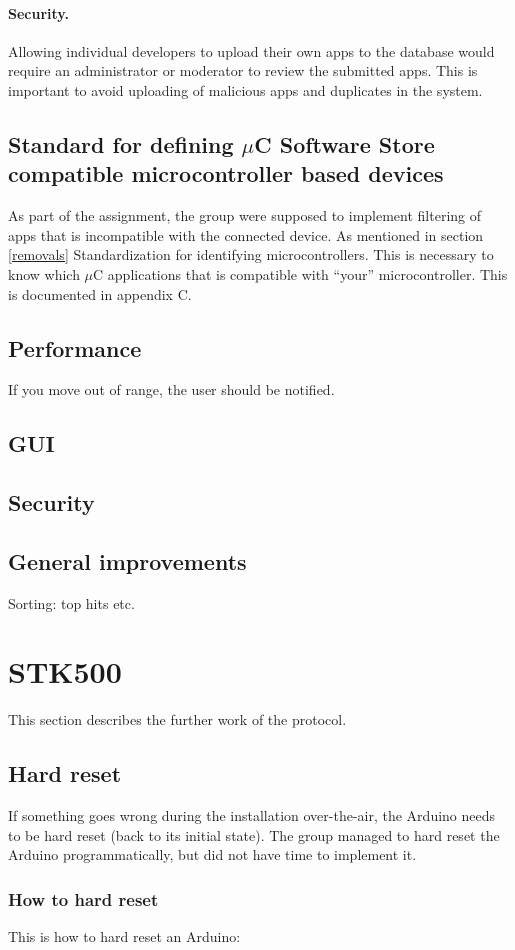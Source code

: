 	\paragraph{Security.} Allowing individual developers to upload their own apps to the database would require an administrator or moderator to review the submitted apps. This is important to avoid uploading of malicious apps and duplicates in the system.

	\subsection{Standard for defining $\mu$C Software Store compatible microcontroller based devices}
	As part of the assignment, the group were supposed to implement filtering of apps that is incompatible with the connected device. As mentioned in section \ref{removals}
	Standardization for identifying microcontrollers. This is necessary to know which $\mu$C applications that is compatible with ``your'' microcontroller. This is documented in appendix C.

	\subsection{Performance}
	If you move out of range, the user should be notified.

	\subsection{GUI}

	\subsection{Security}

	\subsection{General improvements}
	Sorting: top hits etc.


\section{STK500}
This section describes the further work of the protocol.

	\subsection{Hard reset}
	If something goes wrong during the installation over-the-air, the Arduino needs to be hard reset (back to its initial state).
	The group managed to hard reset the Arduino programmatically, but did not have time to implement it.

		\subsubsection{How to hard reset}
		This is how to hard reset an Arduino:
		